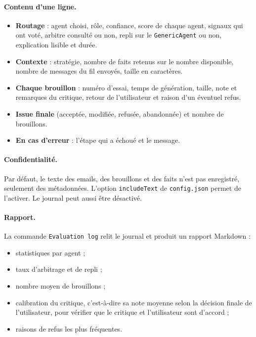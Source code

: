 \documentclass[11pt,a4paper]{article}
\newcommand{\code}[1]{\texttt{#1}}
\begin{document}
\paragraph{Contenu d'une ligne.}
\begin{itemize}
  \item \textbf{Routage} : agent choisi, rôle, confiance, score de chaque agent, signaux
        qui ont voté, arbitre consulté ou non, repli sur le \code{GenericAgent} ou non,
        explication lisible et durée.
  \item \textbf{Contexte} : stratégie, nombre de faits retenus sur le nombre disponible,
        nombre de messages du fil envoyés, taille en caractères.
  \item \textbf{Chaque brouillon} : numéro d'essai, temps de génération, taille, note et
        remarques du critique, retour de l'utilisateur et raison d'un éventuel refus.
  \item \textbf{Issue finale} (acceptée, modifiée, refusée, abandonnée) et nombre de
        brouillons.
  \item \textbf{En cas d'erreur} : l'étape qui a échoué et le message.
\end{itemize}

\paragraph{Confidentialité.} Par défaut, le texte des emails, des brouillons et des faits
n'est pas enregistré, seulement des métadonnées. L'option \code{includeText} de
\code{config.json} permet de l'activer. Le journal peut aussi être désactivé.

\paragraph{Rapport.} La commande \code{Evaluation log} relit le journal et produit un
rapport Markdown :
\begin{itemize}
  \item statistiques par agent ;
  \item taux d'arbitrage et de repli ;
  \item nombre moyen de brouillons ;
  \item calibration du critique, c'est-à-dire sa note moyenne selon la décision finale de
        l'utilisateur, pour vérifier que le critique et l'utilisateur sont d'accord ;
  \item raisons de refus les plus fréquentes.
\end{itemize}
\end{document}

